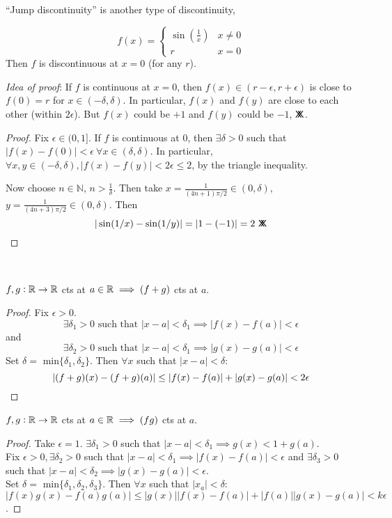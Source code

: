 ``Jump discontinuity'' is another type of discontinuity, 

\vspace*{100pt}

\begin{example}
\[f(x) = \begin{cases}
 \sin(\frac{1}{x}) & x \neq 0\\
 r & x = 0	
 \end{cases}
\] Then $f$ is discontinuous at $x = 0$ (for any $r$).	

\emph{Idea of proof}: If $f$ is continuous at $x = 0$, then $f(x) \in (r-\epsilon, r + \epsilon)$ is close to $f(0) = r$ for $x \in (- \delta, \delta).$ In particular, $f(x)$ and $f(y)$ are close to each other (within $2\epsilon$). But $f(x)$ could be $+1$ and $f(y)$ could be $-1$, $\mathsf{X}\mkern-8.5mu\mathsf{X}$.
\begin{proof}
Fix $\epsilon \in (0,1]$. If $f$ is continuous at $0$, then $\exists \delta > 0$ such that $|f(x) - f(0)| < \epsilon~\forall x \in (\delta,\delta)$. In particular, $\forall x,y \in (-\delta, \delta), |f(x) - f(y)| < 2\epsilon \leq 2$, by the triangle inequality. 

Now choose $n \in \mathbb{N}$, $n > \frac{1}{\delta}$. Then take $x = \frac{1}{(4n+1)\pi/2} \in (0,\delta)$, $y = \frac{1}{(4n+3)\pi/2} \in (0,\delta)$. Then 
\[|\sin(1/x) - \sin(1/y)| = |1 - (-1)| = 2 ~\mathsf{X}\mkern-8.5mu\mathsf{X}\qedhere\]
\end{proof}

\end{example}~


\begin{theorem}
$f,g: \mathbb{R} \to \mathbb{R}$ cts at $a \in \mathbb{R} \implies (f + g)$ cts at $a$.
\end{theorem}
\begin{proof}
	Fix $\epsilon >0.$ \[\exists \delta_1 >0 \text{ such that }|x-a| < \delta_1 \implies |f(x) - f(a)| < \epsilon\] and\[\exists \delta_2 >0 \text{ such that }|x-a| < \delta_1 \implies |g(x) - g(a)| < \epsilon\]
	 Set $\delta =$ min$\{\delta_1,\delta_2\}.$ Then $\forall x$ such that $|x-a| < \delta:$
	\[|(f+g)(x) - (f+g)(a)| \leq |f(x) - f(a)| + |g(x) - g(a)| < 2\epsilon\qedhere\]
\end{proof}\vspace*{5pt}

\begin{theorem}
$f,g: \mathbb{R} \to \mathbb{R}$ cts at $a \in \mathbb{R} \implies (fg)$ cts at $a$.	
\end{theorem}
\begin{proof}
	Take $\epsilon = 1$. $\exists \delta_1 > 0$ such that $|x-a| < \delta_1 \implies g(x) < 1 + g(a)$. \\
	Fix $\epsilon >0, \exists \delta_2 >0$ such that $|x-a| < \delta_1 \implies |f(x) - f(a)| < \epsilon$ and $\exists \delta_3 > 0$ such that $|x-a| < \delta_2 \implies |g(x) - g(a)| < \epsilon$.\vspace*{5pt}\\ Set $\delta =$ min$\{\delta_1,\delta_2,\delta_3\}.$ Then $\forall x$ such that $|x_a| < \delta$: \\
	$|f(x)g(x) - f(a)g(a)| \leq |g(x)||f(x) - f(a)| + |f(a)||g(x) - g(a)| < k\epsilon$.
\end{proof}\vspace*{5pt}


